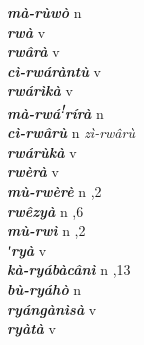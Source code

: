 \begin{multicols}{2}
{{\bfseries\itshape mà-rùwò}} \relax  n   \relax  {} \relax   \relax  \\
{{\bfseries\itshape rwà}} \relax  v  \relax   \relax  {} \relax   \relax  \\
{{\bfseries\itshape rwârà}} \relax  v  \relax   \relax  {} \relax   \relax  \\
{{\bfseries\itshape cì-rwáràntù}} \relax  v   \relax  {} \relax   \relax  \\
{{\bfseries\itshape rwárìkà}} \relax  v  \relax   \relax  {} \relax   \relax  \\
{{\bfseries\itshape mà-rwá\textsuperscript{!}rírà}} \relax  n   \relax  {} \relax   \relax  \\
{{\bfseries\itshape cì-rwârù}} \relax  n   \relax  \textit{zì-rwârù} \relax  \\
{{\bfseries\itshape rwárùkà}} \relax  v  \relax   \relax  {} \relax   \relax  \\
{{\bfseries\itshape rwèrà}} \relax  v  \relax   \relax  {} \relax   \relax  \\
{{\bfseries\itshape mù-rwèrè}} \relax  n  ,2  \relax   \relax  \\
{{\bfseries\itshape rwêzyà}} \relax  n  ,6  \relax   \relax  \\
{{\bfseries\itshape mù-rwì}} \relax  n  ,2  \relax   \relax  \\
{{\bfseries\itshape ʹryà}} \relax  v  \relax   \relax  {} \relax   \relax  \\
{{\bfseries\itshape kà-ryábàcânì}} \relax  n  ,13  \relax   \relax  \\
{{\bfseries\itshape bù-ryáhò}} \relax  n   \relax  {} \relax   \relax  \\
{{\bfseries\itshape ryángànìsà}} \relax  v  \relax   \relax  {} \relax   \relax  \\
{{\bfseries\itshape ryàtà}} \relax  v  \relax   \relax  {} \relax   \relax  \\

\end{multicols}
